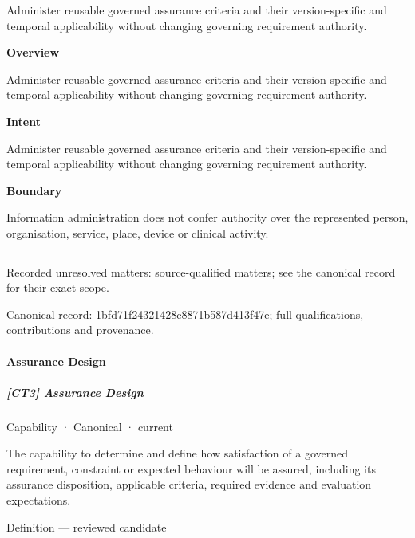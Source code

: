 Administer reusable governed assurance criteria and their version-specific and temporal applicability without changing governing requirement authority.



\textbf{Overview}



Administer reusable governed assurance criteria and their version-specific and temporal applicability without changing governing requirement authority.



\textbf{Intent}



Administer reusable governed assurance criteria and their version-specific and temporal applicability without changing governing requirement authority.



\textbf{Boundary}



Information administration does not confer authority over the represented person, organisation, service, place, device or clinical activity.



\medskip\hrule\medskip

{\small Recorded unresolved matters: source-qualified matters; see the canonical record for their exact scope.}\par
{\footnotesize \href{../../../../continuum/strategy/capability/1bfd71f24321428c8871b587d413f47e.md}{Canonical record: 1bfd71f24321428c8871b587d413f47e}; full qualifications, contributions and provenance.}\par
\paragraph{Assurance Design}

\subparagraph{[CT3] Assurance Design}

\label{element:71c8a612b88f4ecba049e94d506bd0c2}
{\small Capability · Canonical · current}\par

The capability to determine and define how satisfaction of a governed requirement, constraint or expected behaviour will be assured, including its assurance disposition, applicable criteria, required evidence and evaluation expectations.



Definition — reviewed candidate



